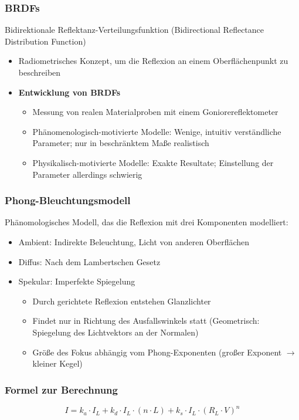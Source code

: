 \subsubsection{BRDFs}
Bidirektionale Reflektanz-Verteilungsfunktion (Bidirectional Reflectance Distribution Function)
\begin{itemize}
	\item Radiometrisches Konzept, um die Reflexion an einem Oberflächenpunkt zu beschreiben
	\item \textbf{Entwicklung von BRDFs}
	\begin{itemize}
		\item Messung von realen Materialproben mit einem Goniorereflektometer
		\item Phänomenologisch-motivierte Modelle: Wenige, intuitiv verständliche Parameter; nur in beschränktem Maße realistisch
		\item Physikalisch-motivierte Modelle: Exakte Resultate; Einstellung der Parameter allerdings schwierig
	\end{itemize}
\end{itemize}


\subsubsection{Phong-Bleuchtungsmodell}
Phänomologisches Modell, das die Reflexion mit drei Komponenten modelliert:
\begin{itemize}
	\item Ambient: Indirekte Beleuchtung, Licht von anderen Oberflächen
	\item Diffus: Nach dem Lambertschen Gesetz
	\item Spekular: Imperfekte Spiegelung
	\begin{itemize}
		\item Durch gerichtete Reflexion entstehen Glanzlichter
		\item Findet nur in Richtung des Ausfallswinkels statt (Geometrisch: Spiegelung des Lichtvektors an der Normalen)
		\item Größe des Fokus abhängig vom Phong-Exponenten (großer Exponent \(\rightarrow\) kleiner Kegel)
	\end{itemize}
\end{itemize}

\subsubsection{Formel zur Berechnung}
\[I = k_a\cdot I_L + k_d\cdot I_L \cdot (n\cdot L) + k_s\cdot I_L \cdot (R_L \cdot V)^n\]

